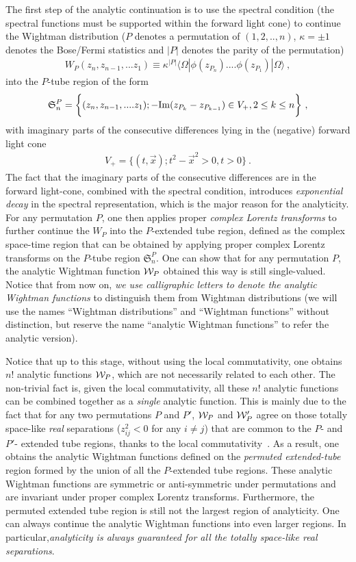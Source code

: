 \documentclass[a4paper,11pt]{article}
\begin{document}
The first step of the analytic continuation is to use the spectral condition (the spectral functions must be supported within the forward light cone) to continue the Wightman distribution  ($P$ denotes a permutation of $(1,2,..,n)$, $\kappa=\pm 1$ denotes the Bose/Fermi statistics and $|P|$ denotes the parity of the permutation)
\begin{align}
W_P(z_{n},z_{n-1},...z_{1}) \equiv \kappa^{|P|} \langle\Omega|\phi(z_{P_n})....\phi(z_{P_1})|\Omega \rangle \ ,
\end{align}
into the $P$-tube region  of the form
\begin{align}\label{eq:tube}
\mathfrak{S}^P_n=\bigg\{(z_{n},z_{n-1},....z_{1}); -{\rm Im}(z_{P_k}-z_{P_{k-1}})\in V_+, 2\le k\le n \bigg\} \ ,
\end{align}
with imaginary parts of the consecutive differences lying in the (negative) forward light cone
\begin{align}
V_+=\big\{(t,\vec{x});t^2-\vec{x}^2>0, t>0 \big\} \ .
\end{align}
The fact that the imaginary parts of the consecutive differences are in the forward light-cone, combined with the spectral condition, introduces {\it exponential decay} in the spectral representation, which is the major reason for the analyticity. For any permutation $P$, one then applies proper {\it complex Lorentz transforms} to further continue the $W_P$ into the $P$-extended tube region, defined as the complex space-time region that can be obtained by applying proper complex Lorentz transforms on the $P$-tube region $\mathfrak{S}^P_n$. One can show that for any permutation $P$, the analytic Wightman function ${\cal W}_P$ obtained this way is still single-valued. Notice that from now on,  {\it we use calligraphic letters to denote the analytic Wightman functions} to distinguish them from Wightman distributions (we will use the names ``Wightman distributions'' and ``Wightman functions'' without distinction, but reserve the name ``analytic Wightman functions'' to refer the analytic version).


Notice that up to this stage,  without using the local commutativity, one obtains $n!$ analytic functions ${\cal W}_P$, which are not necessarily related to each other. The non-trivial fact is, given the local commutativity, all these $n!$ analytic functions can be combined together as a {\it single} analytic function. This is mainly due to the fact that for any two permutations $P$ and $P'$, ${\cal W}_P$ and ${\cal W}_P'$ agree on those totally space-like {\it real} separations ($z_{ij}^2<0$ for any $i\ne j$) that are common to the $P$- and $P'$- extended tube regions,  thanks to the local commutativity~\cite{Jost:1965yxu}. As a result, one obtains the analytic Wightman functions defined on the {\it permuted extended-tube} region formed by the union of all the $P$-extended tube regions. These analytic Wightman functions are symmetric or anti-symmetric under permutations and are invariant under proper complex Lorentz transforms. Furthermore, the permuted extended tube region is still not the largest region of analyticity. One can always continue the analytic Wightman functions into even larger regions. In particular,{\it analyticity is always guaranteed for all the totally space-like real separations}.
\end{document}
